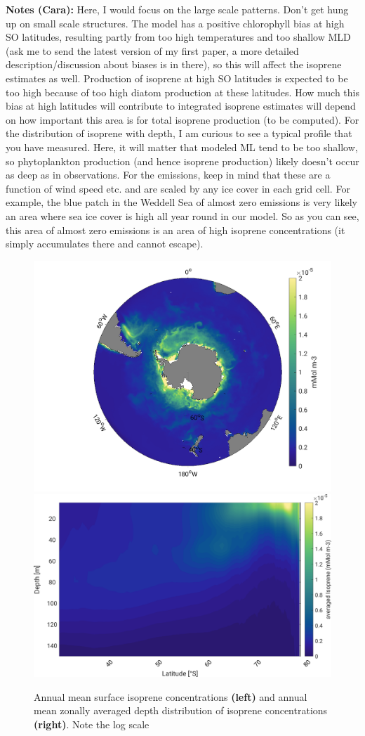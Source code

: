 \documentclass[draft,linenumbers]{agujournal}
\begin{document}
\textbf{Notes (Cara):}
Here, I would focus on the large scale patterns. Don't get hung up on small scale structures. The model has a positive chlorophyll bias at high SO latitudes, resulting partly from too high temperatures and too shallow MLD (ask me to send the latest version of my first paper, a more detailed description/discussion about biases is in there), so this will affect the isoprene estimates as well. Production of isoprene at high SO latitudes is expected to be too high because of too high diatom production at these latitudes. How much this bias at high latitudes will contribute to integrated isoprene estimates will depend on how important this area is for total isoprene production (to be computed).
For the distribution of isoprene with depth, I am curious to see a typical profile that you have measured. Here, it will matter that modeled ML tend to be too shallow, so phytoplankton production (and hence isoprene production) likely doesn't occur as deep as in observations.
For the emissions, keep in mind that these are a function of wind speed etc. and are scaled by any ice cover in each grid cell. For example, the blue patch in the Weddell Sea of almost zero emissions is very likely an area where sea ice cover is high all year round in our model. So as you can see, this area of almost zero emissions is an area of high isoprene concentrations (it simply accumulates there and cannot escape).

\begin{figure}[h]
\centering
\includegraphics[width=.4\textwidth]{Plots/ISOPRENE_annual_at_10m_031.png}
\includegraphics[width=.4\textwidth]{Plots/Zonal_avg_annual_mean_ISOPRENE_031_clm.png}
\caption{Annual mean surface isoprene concentrations \textbf{(left)} and annual mean zonally averaged depth distribution of isoprene concentrations \textbf{(right)}. Note the log scale}
\label{fig:spatial}
\end{figure}
\end{document}
